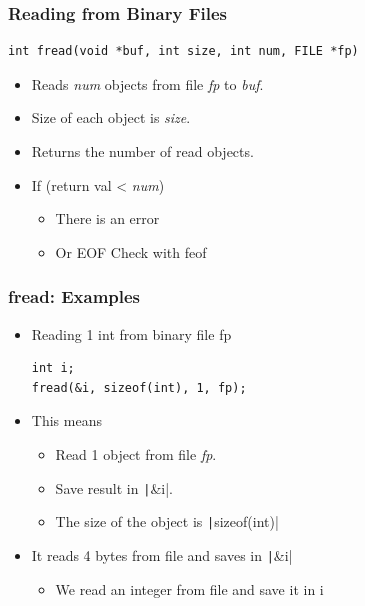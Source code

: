 \documentclass{../c-lecture}
\begin{document}
\begin{frame}[fragile]
  \frametitle{Reading from Binary Files}
  \begin{verbatim}
int fread(void *buf, int size, int num, FILE *fp)
  \end{verbatim}
  \begin{itemize}
    \item
      Reads \textit{\color{YellowOrange} num} objects from file
      \textit{\color{Violet} fp} to \textit{\color{LimeGreen} buf}.
    \item Size of each object is \textit{\color{Yellow} size}.
    \item Returns the number of read objects.
    \item If (return val < \textit{\color{YellowOrange} num})
    \begin{itemize}
      \item There is an error
      \item Or EOF \textrightarrow Check with feof
    \end{itemize}
  \end{itemize}
\end{frame}

\begin{frame}[fragile]
  \frametitle{fread: Examples}
  \begin{itemize}
    \item Reading 1 int from binary file fp
    \begin{verbatim}
int i;
fread(&i, sizeof(int), 1, fp);
    \end{verbatim}
    \item This means
    \begin{itemize}
      \item
        Read \textcolor{YellowOrange}{1} object from file
        \textit{\color{Violet} fp}.
      \item Save result in \texttt|&i|.
      \item
        The size of the object is \texttt|sizeof(int)|
    \end{itemize}
    \item It reads 4 bytes from file and saves in \texttt|&i|
    \begin{itemize}
      \item We read an integer from file and save it in \textcolor{YellowOrange}{i}
    \end{itemize}
  \end{itemize}
\end{frame}
\end{document}
